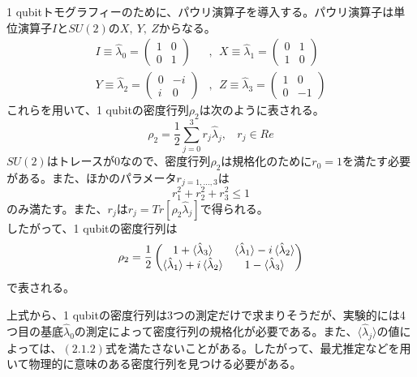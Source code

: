 \documentclass[11pt,a4j,notitlepage]{jreport}
\begin{document}
	1 qubitトモグラフィーのために、パウリ演算子を導入する。パウリ演算子は単位演算子$I$と$SU(2)$の$X,\ Y,\ Z$からなる。
	\begin{equation}
		\begin{aligned}
			I \equiv \hat{\lambda}_0 = \begin{pmatrix} 1 & 0 \\ 0 & 1 \end{pmatrix}&,\ \ X \equiv \hat{\lambda}_1 = \begin{pmatrix} 0 & 1 \\ 1 & 0 \end{pmatrix}\\
			Y \equiv \hat{\lambda}_2 = \begin{pmatrix} 0 & -i \\ i & 0 \end{pmatrix}&,\ \ Z \equiv \hat{\lambda}_3 = \begin{pmatrix} 1 & 0 \\ 0 & -1 \end{pmatrix}
		\end{aligned}
		\label{eq2.3}
	\end{equation}
	これらを用いて、1 qubitの密度行列$\rho_2$は次のように表される。
	\begin{equation}
		\rho_2 = \frac{1}{2} \sum_{j=0}^3 r_j \hat{\lambda}_j, \ \ \ \ r_j \in Re
		\label{eq2.4}
	\end{equation}
	$SU(2)$はトレースが0なので、密度行列$\rho_2$は規格化のために$r_0 = 1$を満たす必要がある。また、ほかのパラメータ$r_{j=1,...,3}$は
	\begin{equation}
		r_1^2 + r_2^2 + r_3^2 \leq 1
		\label{eq2.5}
	\end{equation}
	のみ満たす。また、$r_j$は$r_j = Tr[\rho_2 \hat{\lambda}_j]$で得られる。\\
	
	したがって、1 qubitの密度行列は
	\begin{equation}
		\rho_2 = \frac{1}{2} \begin{pmatrix}
			1 + \braket{\hat{\lambda}_3} &
			\braket{\hat{\lambda}_1} - i \braket{\hat{\lambda}_2} \\
			\braket{\hat{\lambda}_1} + i \braket{\hat{\lambda}_2} &
			1 - \braket{\hat{\lambda}_3}
			\end{pmatrix}
	\end{equation}
	で表される。
	
	上式から、1 qubitの密度行列は3つの測定だけで求まりそうだが、実験的には4つ目の基底$\hat{\lambda}_0$の測定によって密度行列の規格化が必要である。また、$\langle \hat{\lambda}_j \rangle$の値によっては、$(2.1.2)$式を満たさないことがある。したがって、最尤推定などを用いて物理的に意味のある密度行列を見つける必要がある。
\end{document}
